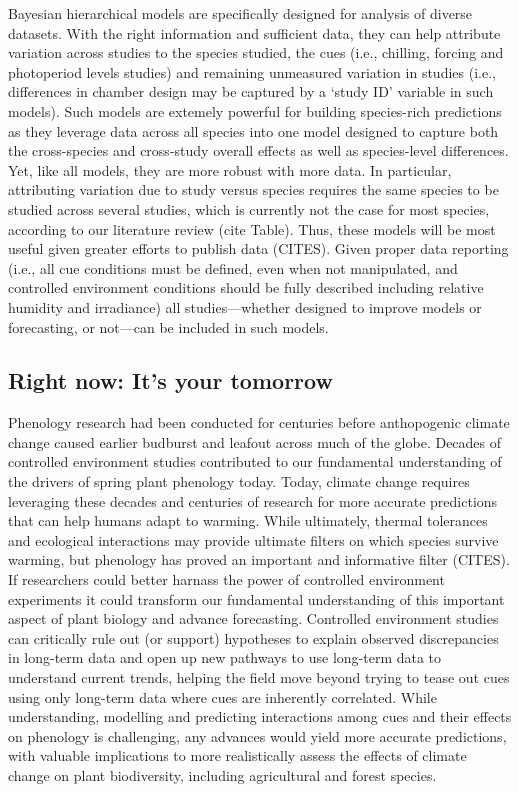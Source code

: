 \documentclass[11pt,letter]{article}
\begin{document}
Bayesian hierarchical models are specifically designed for analysis of diverse datasets. With the right information and sufficient data, they can help attribute variation across studies to the species studied, the cues (i.e., chilling, forcing and photoperiod levels studies) and remaining unmeasured variation in studies (i.e., differences in chamber design may be captured by a `study ID' variable in such models). Such models are extemely powerful for building species-rich predictions as they leverage data across all species into one model designed to capture both the cross-species and cross-study overall effects as well as species-level differences. Yet, like all models, they are more robust with more data. In particular, attributing variation due to study versus species requires the same species to be studied across several studies, which is currently not the case for most species, according to our literature review (cite Table). Thus, these models will be most useful given greater efforts to publish data (CITES). Given proper data reporting (i.e., all cue conditions must be defined, even when not manipulated, and controlled environment conditions should be fully described including relative humidity and irradiance) all studies---whether designed to improve models or forecasting, or not---can be included in such models. 

\subsection{Right now: It's your tomorrow}
Phenology research had been conducted for centuries before anthopogenic climate change caused earlier budburst and leafout across much of the globe. Decades of controlled environment studies contributed to our fundamental understanding of the drivers of spring plant phenology today. Today, climate change requires leveraging these decades and centuries of research for more accurate predictions that can help humans adapt to warming. While ultimately, thermal tolerances and ecological interactions may provide ultimate filters on which species survive warming, but phenology has proved an important and informative filter (CITES).\\

If researchers could better harnass the power of controlled environment experiments it could transform our fundamental understanding of this important aspect of plant biology and advance forecasting. Controlled environment studies can critically rule out (or support) hypotheses to explain observed discrepancies in long-term data and open up new pathways to use long-term data to understand current trends, helping the field move beyond trying to tease out cues using only long-term data where cues are inherently correlated. While understanding, modelling and predicting interactions among cues and their effects on phenology is challenging, any advances would yield more accurate predictions, with valuable implications to more realistically assess the effects of climate change on plant biodiversity, including agricultural and forest species. %
\end{document}
